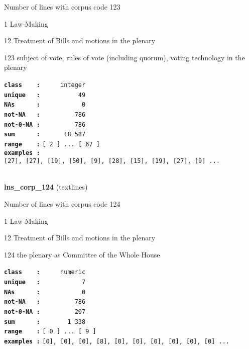 \documentclass[]{article}
\begin{document}
Number of lines with corpus code 123

1 Law-Making

12 Treatment of Bills and motions in the plenary

123 subject of vote, rules of vote (including quorum), voting technology
in the plenary

\textbf{\texttt{class\ \ \ \ :}} \texttt{~~~~~integer}\\
\textbf{\texttt{unique\ \ \ :}} \texttt{~~~~~~~~~~49}\\
\textbf{\texttt{NAs\ \ \ \ \ \ :}} \texttt{~~~~~~~~~~~0}\\
\textbf{\texttt{not-NA\ \ \ :}} \texttt{~~~~~~~~~786}\\
\textbf{\texttt{not-0-NA\ :}} \texttt{~~~~~~~~~786}\\
\textbf{\texttt{sum\ \ \ \ \ \ :}} \texttt{~~~~~~18~587}\\
\textbf{\texttt{range\ \ \ \ :}}
\texttt{{[}\ 2\ {]}\ ...\ {[}\ 67\ {]}}\\
\textbf{\texttt{examples\ :}}
\texttt{{[}27{]},\ {[}27{]},\ {[}19{]},\ {[}50{]},\ {[}9{]},\ {[}28{]},\ {[}15{]},\ {[}19{]},\ {[}27{]},\ {[}9{]}\ ...}\\

~

\textbf{lns\_corp\_124} (textlines)

Number of lines with corpus code 124

1 Law-Making

12 Treatment of Bills and motions in the plenary

124 the plenary as Committee of the Whole House

\textbf{\texttt{class\ \ \ \ :}} \texttt{~~~~~numeric}\\
\textbf{\texttt{unique\ \ \ :}} \texttt{~~~~~~~~~~~7}\\
\textbf{\texttt{NAs\ \ \ \ \ \ :}} \texttt{~~~~~~~~~~~0}\\
\textbf{\texttt{not-NA\ \ \ :}} \texttt{~~~~~~~~~786}\\
\textbf{\texttt{not-0-NA\ :}} \texttt{~~~~~~~~~207}\\
\textbf{\texttt{sum\ \ \ \ \ \ :}} \texttt{~~~~~~~1~338}\\
\textbf{\texttt{range\ \ \ \ :}}
\texttt{{[}\ 0\ {]}\ ...\ {[}\ 9\ {]}}\\
\textbf{\texttt{examples\ :}}
\texttt{{[}0{]},\ {[}0{]},\ {[}0{]},\ {[}8{]},\ {[}0{]},\ {[}0{]},\ {[}0{]},\ {[}0{]},\ {[}0{]},\ {[}0{]}\ ...}\\
\end{document}
